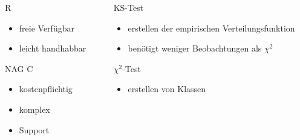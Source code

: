 \documentclass{beamer}
\begin{document}
\begin{frame}{\insertsection}

\begin{columns}
\begin{column}{.48\textwidth}
\begin{block}{R}
	\begin{itemize}
		\item freie Verfügbar
		\item leicht handhabbar
	\end{itemize}
\end{block}
\vspace{1cm}

\begin{block}{NAG C}
	\begin{itemize}
		\item kostenpflichtig
		\item komplex
		\item Support
	\end{itemize}
\end{block}
\end{column}

\hfill
\begin{column}{.48\textwidth}
\begin{block}{KS-Test}
	\begin{itemize}
		\item erstellen der empirischen Verteilungsfunktion
		\item benötigt weniger Beobachtungen als $\chi^2$
	\end{itemize}
\end{block}
\vspace{1cm}
\begin{block}{$\chi^2$-Test}
	\begin{itemize}
		\item erstellen von Klassen
	\end{itemize}
\end{block}
\end{column}
\end{columns}




\end{frame}
\end{document}
